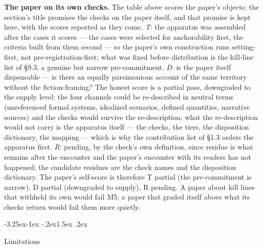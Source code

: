 \documentclass[11pt,a4paper]{article}
\makeatletter
\renewcommand\subsection{\@startsection{subsection}{2}{\z@}%
  {-3.25ex\@plus -1ex \@minus -.2ex}{1.5ex \@plus .2ex}%
  {\normalfont\large\bfseries\raggedright}}
\makeatother
\begin{document}
\textbf{The paper on its own checks.} The table above scores the paper's objects; the section's title promises the checks on the paper itself, and that promise is kept here, with the scores reported as they come. \textit{T}: the apparatus was assembled after the cases it scores — the cases were selected for anchorability first, the criteria built from them second — so the paper's own construction runs setting-first, not pre-registration-first; what was fixed before distribution is the kill-line list of §9.3, a genuine but narrow pre-commitment. \textit{D}: is the paper itself dispensable — is there an equally parsimonious account of the same territory without the fiction-framing? The honest score is a partial pass, downgraded to the supply level: the four channels could be re-described in neutral terms (unreferenced formal systems, idealized scenarios, defined quantities, narrative sources) and the checks would survive the re-description; what the re-description would not carry is the apparatus itself — the checks, the tiers, the disposition dictionary, the mapping — which is why the contribution list of §1.3 orders the apparatus first. \textit{R}: pending, by the check's own definition, since residue is what remains after the encounter and the paper's encounter with its readers has not happened; the candidate residues are the check names and the disposition dictionary. The paper's self-score is therefore T partial (the pre-commitment is narrow), D partial (downgraded to supply), R pending. A paper about kill lines that withheld its own would fail M5; a paper that graded itself above what its checks return would fail them more quietly.

\subsection{Limitations}
\end{document}
